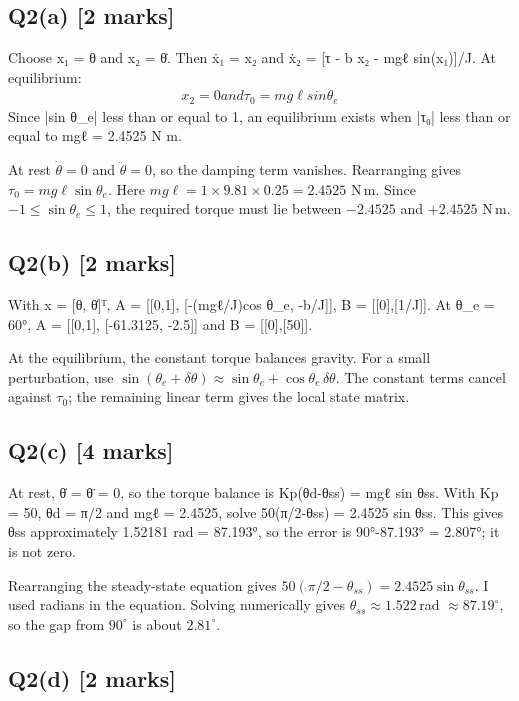 \documentclass[11pt,a4paper]{article}
\begin{document}
\subsection*{Q2(a) \hfill [2 marks]}

Choose x₁ = θ and x₂ = θ̇.
Then ẋ₁ = x₂ and ẋ₂ = [τ - b x₂ - mgℓ sin(x₁)]/J.
At equilibrium:\[\begin{aligned}x_2 = 0 and τ_0 = mg\ell sin \theta_e\end{aligned}\]
Since |sin θ\_e| less than or equal to 1, an equilibrium exists when |τ₀| less than or equal to mgℓ = 2.4525 N m.\par\smallskip At rest $\dot\theta=0$ and $\ddot\theta=0$, so the damping term vanishes. Rearranging gives $\tau_0=mg\ell\sin\theta_e$. Here $mg\ell=1\times9.81\times0.25=2.4525$ N\,m. Since $-1\leq\sin\theta_e\leq1$, the required torque must lie between $-2.4525$ and $+2.4525$ N\,m.

\subsection*{Q2(b) \hfill [2 marks]}

With x = [θ, θ̇]ᵀ, A = [[0,1], [-(mgℓ/J)cos θ\_e, -b/J]], B = [[0],[1/J]].
At θ\_e = 60°, A = [[0,1], [-61.3125, -2.5]] and B = [[0],[50]].\par\smallskip At the equilibrium, the constant torque balances gravity. For a small perturbation, use $\sin(\theta_e+\delta\theta)\approx\sin\theta_e+\cos\theta_e\,\delta\theta$. The constant terms cancel against $\tau_0$; the remaining linear term gives the local state matrix.

\subsection*{Q2(c) \hfill [4 marks]}

At rest, θ̇ = θ̈ = 0, so the torque balance is Kp(θd-θss) = mgℓ sin θss.
With Kp = 50, θd = π/2 and mgℓ = 2.4525, solve 50(π/2-θss) = 2.4525 sin θss.
This gives θss approximately 1.52181 rad = 87.193°, so the error is 90°-87.193° = 2.807°; it is not zero.\par\smallskip Rearranging the steady-state equation gives $50(\pi/2-\theta_{ss})=2.4525\sin\theta_{ss}$. I used radians in the equation. Solving numerically gives $\theta_{ss}\approx1.522\,$rad $\approx87.19^\circ$, so the gap from $90^\circ$ is about $2.81^\circ$.

\subsection*{Q2(d) \hfill [2 marks]}
\end{document}
